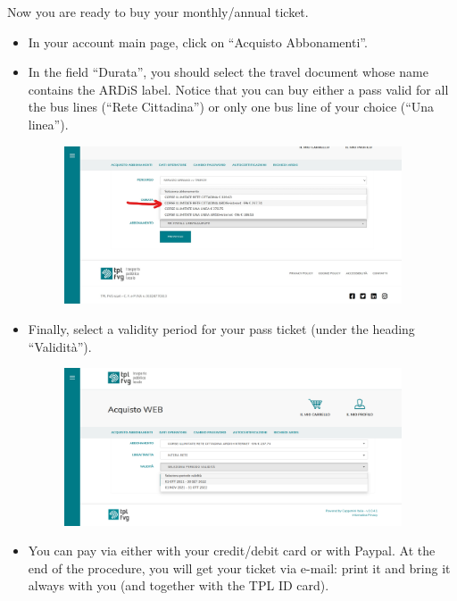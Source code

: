 \documentclass{sissavademecum}
\begin{document}
Now you are ready to buy your monthly/annual ticket.

\begin{itemize}
    \item In your account main page, click on ``Acquisto Abbonamenti''.
    \item In the field ``Durata'', you should select the travel document whose name contains the ARDiS label. Notice that you can buy either a pass valid for all the bus lines (``Rete Cittadina'') or only one bus line of your choice (``Una linea'').
    \begin{figure}[H]
        \begin{center}
            \includegraphics[width=10cm]{ardis_bus/s10.jpg}
        \end{center}
    \end{figure}
    \item Finally, select a validity period for your pass ticket (under the heading ``Validità'').
    \begin{figure}[H]
        \begin{center}
            \includegraphics[width=10cm]{ardis_bus/s11.png}
        \end{center}
    \end{figure}
    \item You can pay via either with your credit/debit card or with Paypal. At the end of the procedure, you will get your ticket via e-mail: print it and bring it always with you (and together with the TPL ID card).
\end{itemize}
\end{document}
